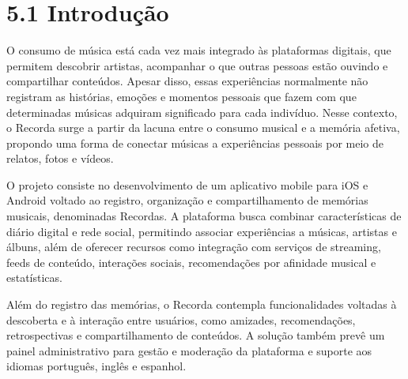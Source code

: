 \hypertarget{__RefHeading___Toc4829_3118176633}{}
\section*{5.1 Introdução}
\label{ages-iv:text-h-0106}

O consumo de música está cada vez mais integrado às plataformas digitais, que permitem descobrir artistas, acompanhar o que outras pessoas estão ouvindo e compartilhar conteúdos. Apesar disso, essas experiências normalmente não registram as histórias, emoções e momentos pessoais que fazem com que determinadas músicas adquiram significado para cada indivíduo. Nesse contexto, o Recorda surge a partir da lacuna entre o consumo musical e a memória afetiva, propondo uma forma de conectar músicas a experiências pessoais por meio de relatos, fotos e vídeos.\par

O projeto consiste no desenvolvimento de um aplicativo mobile para iOS e Android voltado ao registro, organização e compartilhamento de memórias musicais, denominadas Recordas. A plataforma busca combinar características de diário digital e rede social, permitindo associar experiências a músicas, artistas e álbuns, além de oferecer recursos como integração com serviços de streaming, feeds de conteúdo, interações sociais, recomendações por afinidade musical e estatísticas.\originalspace{}\par

Além do registro das memórias, o Recorda contempla funcionalidades voltadas à descoberta e à interação entre usuários, como amizades, recomendações, retrospectivas e compartilhamento de conteúdos. A solução também prevê um painel administrativo para gestão e moderação da plataforma e suporte aos idiomas português, inglês e espanhol.\par

